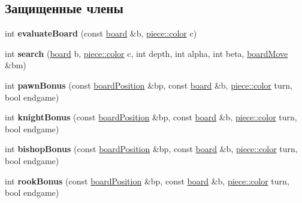 \subsection*{Защищенные члены}
\begin{DoxyCompactItemize}
\item 
\hypertarget{class_a_i_a1c6741642292f898fdf8d7ce6c13683f}{}int {\bfseries evaluate\+Board} (const \hyperlink{classboard}{board} \&b, \hyperlink{classpiece_a0e121e5952345fd0e7014a8e6a1fbbda}{piece\+::color} c)\label{class_a_i_a1c6741642292f898fdf8d7ce6c13683f}

\item 
\hypertarget{class_a_i_ad66d3b4e9d52d3025d3e043cb90dfd3e}{}int {\bfseries search} (\hyperlink{classboard}{board} b, \hyperlink{classpiece_a0e121e5952345fd0e7014a8e6a1fbbda}{piece\+::color} c, int depth, int alpha, int beta, \hyperlink{classboard_move}{board\+Move} \&bm)\label{class_a_i_ad66d3b4e9d52d3025d3e043cb90dfd3e}

\item 
\hypertarget{class_a_i_a748a22bb7df0c157ac1db36d1357a749}{}int {\bfseries pawn\+Bonus} (const \hyperlink{classboard_position}{board\+Position} \&bp, const \hyperlink{classboard}{board} \&b, \hyperlink{classpiece_a0e121e5952345fd0e7014a8e6a1fbbda}{piece\+::color} turn, bool endgame)\label{class_a_i_a748a22bb7df0c157ac1db36d1357a749}

\item 
\hypertarget{class_a_i_a27427ae20aa7eb46effbd28fc29917e7}{}int {\bfseries knight\+Bonus} (const \hyperlink{classboard_position}{board\+Position} \&bp, const \hyperlink{classboard}{board} \&b, \hyperlink{classpiece_a0e121e5952345fd0e7014a8e6a1fbbda}{piece\+::color} turn, bool endgame)\label{class_a_i_a27427ae20aa7eb46effbd28fc29917e7}

\item 
\hypertarget{class_a_i_a1c5a4f19af6bc2d2827db4c7df4b0927}{}int {\bfseries bishop\+Bonus} (const \hyperlink{classboard_position}{board\+Position} \&bp, const \hyperlink{classboard}{board} \&b, \hyperlink{classpiece_a0e121e5952345fd0e7014a8e6a1fbbda}{piece\+::color} turn, bool endgame)\label{class_a_i_a1c5a4f19af6bc2d2827db4c7df4b0927}

\item 
\hypertarget{class_a_i_af25d9b4511e7c435c9593ca2c1f3335d}{}int {\bfseries rook\+Bonus} (const \hyperlink{classboard_position}{board\+Position} \&bp, const \hyperlink{classboard}{board} \&b, \hyperlink{classpiece_a0e121e5952345fd0e7014a8e6a1fbbda}{piece\+::color} turn, bool endgame)\label{class_a_i_af25d9b4511e7c435c9593ca2c1f3335d}


\end{DoxyCompactItemize}
